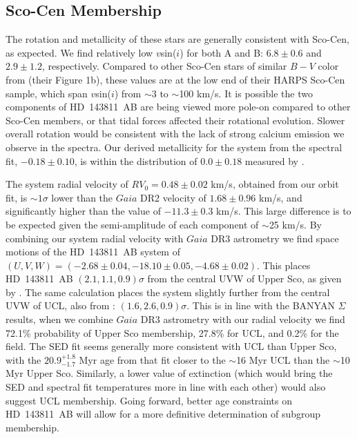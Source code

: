 \documentclass[]{aastex701} %
\begin{document}
\subsection{Sco-Cen Membership}

The rotation and metallicity of these stars are generally consistent with Sco-Cen, as expected. We find relatively low $v$sin($i$) for both A and B: $6.8 \pm 0.6$ and $2.9 \pm 1.2$, respectively. Compared to other Sco-Cen stars of similar $B-V$ color from \citet{grandjean:2023} (their Figure 1b), these values are at the low end of their HARPS Sco-Cen sample, which span $v$sin($i$) from $\sim$3 to $\sim$100 km/s. It is possible the two components of HD~143811~AB are being viewed more pole-on compared to other Sco-Cen members, or that tidal forces affected their rotational evolution. Slower overall rotation would be consistent with the lack of strong calcium emission we observe in the spectra. Our derived metallicity for the system from the spectral fit, $-0.18 \pm 0.10$, is within the distribution of $0.0 \pm 0.18$ measured by \citet{grandjean:2023}.

The system radial velocity of $RV_0 = 0.48 \pm 0.02$ km/s, obtained from our orbit fit, is $\sim 1 \sigma$ lower than the $Gaia$ DR2 velocity of $1.68 \pm 0.96$ km/s, and significantly higher than the \citet{chen:2011} value of $-11.3 \pm 0.3$ km/s. This large difference is to be expected given the semi-amplitude of each component of $\sim$25 km/s. By combining our system radial velocity with $Gaia$ DR3 astrometry we find space motions of the HD~143811~AB system of $(U,V,W) = (-2.68 \pm 0.04, -18.10 \pm 0.05, -4.68 \pm 0.02)$. This places HD~143811~AB $(2.1,1.1,0.9) \sigma$ from the central UVW of Upper Sco, as given by \citet{wright:2018}. The same calculation places the system slightly further from the central UVW of UCL, also from \citet{wright:2018}: $(1.6,2.6,0.9) \sigma$. This is in line with the BANYAN $\Sigma$ results, when we combine $Gaia$ DR3 astrometry with our radial velocity we find 72.1\% probability of Upper Sco membership, 27.8\% for UCL, and 0.2\% for the field. The SED fit seems generally more consistent with UCL than Upper Sco, with the $20.9^{+1.8}_{-1.7}$ Myr age from that fit closer to the $\sim$16 Myr UCL than the $\sim$10 Myr Upper Sco. Similarly, a lower value of extinction (which would bring the SED and spectral fit temperatures more in line with each other) would also suggest UCL membership. Going forward, better age constraints on HD~143811~AB will allow for a more definitive determination of subgroup membership.
\end{document}

